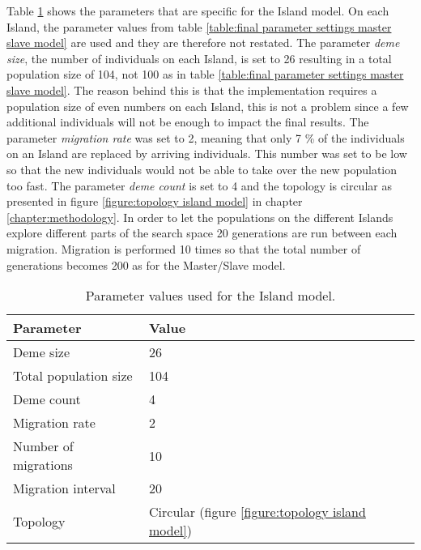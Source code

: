 \noindent Table \ref{table:final parameter settings island model} shows the parameters that are specific for the Island model. On each Island, the parameter values from table \ref{table:final parameter settings master slave model} are used and they are therefore not restated. The parameter \textit{deme size}, the number of individuals on each Island, is set to 26 resulting in a total population size of 104, not 100 as in table \ref{table:final parameter settings master slave model}. The reason behind this is that the implementation requires a population size of even numbers on each Island, this is not a problem since a few additional individuals will not be enough to impact the final results. The parameter \textit{migration rate} was set to 2, meaning that only 7 \% of the individuals on an Island are replaced by arriving individuals. This number was set to be low so that the new individuals would not be able to take over the new population too fast. The parameter \textit{deme count} is set to 4 and the topology is circular as presented in figure \ref{figure:topology island model} in chapter \ref{chapter:methodology}. In order to let the populations on the different Islands explore different parts of the search space 20 generations are run between each migration. Migration is performed 10 times so that the total number of generations becomes 200 as for the Master/Slave model. \\


\begin{table}[h!]
\centering
\caption{Parameter values used for the Island model.}
\label{table:final parameter settings island model}
\begin{tabular}{l|l}
\textbf{Parameter} & \textbf{Value} \\ 
\hline 
Deme size & 26 \\
Total population size & 104 \\  
Deme count & 4 \\
Migration rate & 2 \\
Number of migrations & 10 \\ 
Migration interval & 20 \\
Topology & Circular (figure \ref{figure:topology island model}) \\
\end{tabular}
\end{table}


